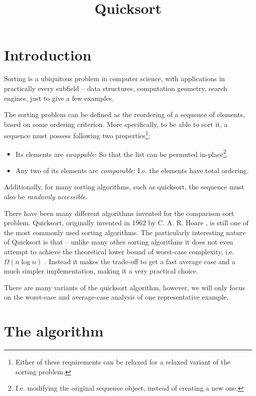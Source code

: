 \documentclass[]{finalproject}
\title{Quicksort}
\subtitle{}
\begin{document}
\maketitle

\section{Introduction} \label{introduction}

Sorting is a ubiquitous problem in computer science, with applications in practically every subfield -- data structures, computation geometry, search engines, just to give a few examples.

The sorting problem can be defined as the reordering of a sequence of elements, based on some ordering criterion. More specifically, to be able to sort it, a sequence must possess following two properties\footnote{Either of these requirements can be relaxed for a relaxed variant of the sorting problem.}:

\begin{itemize}
\item Its elements are \textit{swappable}: So that the list can be permuted in-place\footnote{I.e. modifying the original sequence object, instead of creating a new one.}.
\item Any two of its elements are \textit{comparable}: I.e. the elements have total ordering.
\end{itemize}

Additionally, for many sorting algorithms, such as quicksort, the sequence must also be \textit{randomly accessible}.

There have been many different algorithms invented for the comparison sort problem. Quicksort, originally invented in 1962 by C. A. R. Hoare \cite{hoare1962quicksort}, is still one of the most commonly used sorting algorithms. The particularly interesting nature of Quicksort is that -- unlike many other sorting algorithms it does not even attempt to achieve the theoretical lower bound of worst-case complexity, i.e. $\Omega(n\log n)$ \cite[p.~193]{clrs}. Instead it makes the trade-off to get a fast average case and a much simpler implementation, making it a very practical choice.

There are many variants of the quicksort algorithm, however, we will only focus on the worst-case and average-case analysis of one representative example.

\section{The algorithm}
\end{document}
